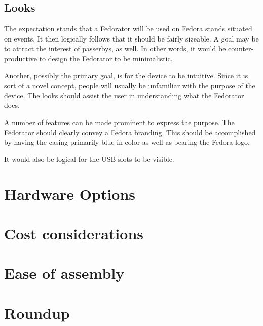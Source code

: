         \subsection{Looks}
            
            The expectation stands that a Fedorator will be used on Fedora stands situated on events.  It then logically follows that it should be fairly sizeable.  A goal may be to attract the interest of passerbys, as well.  In other words, it would be counter-productive to design the Fedorator to be minimalistic.
            
            Another, possibly the primary goal, is for the device to be intuitive.  Since it is sort of a novel concept, people will usually be unfamiliar with the purpose of the device.  The looks should assist the user in understanding what the Fedorator does.
            
            A number of features can be made prominent to express the purpose.  The Fedorator should clearly convey a Fedora branding.  This should be accomplished by having the casing primarily blue in color as well as bearing the Fedora logo.
            
            
            It would also be logical for the USB slots to be visible.
            
            
            
        \subsection{}
            \blind[1]
    \section{Hardware Options}
        \blind[4]
    \section{Cost considerations}
        \blind[2]
    \section{Ease of assembly}
        \blind[2]
    \section{Roundup}
        \blind[2]
